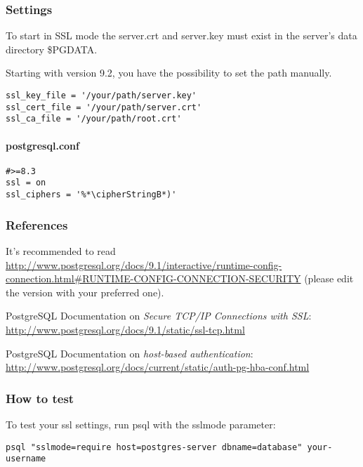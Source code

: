 \subsubsection{Settings}
To start in SSL mode the server.crt and server.key must exist in the server's data directory \$PGDATA.

Starting with version 9.2, you have the possibility to set the path manually.

\begin{lstlisting}
ssl_key_file = '/your/path/server.key'
ssl_cert_file = '/your/path/server.crt'
ssl_ca_file = '/your/path/root.crt'
\end{lstlisting}

\paragraph*{postgresql.conf}
\begin{lstlisting}
#>=8.3
ssl = on 
ssl_ciphers = '%*\cipherStringB*)'
\end{lstlisting}


\subsubsection{References}
\begin{itemize*}
  \item It's recommended to read \url{http://www.postgresql.org/docs/9.1/interactive/runtime-config-connection.html\#RUNTIME-CONFIG-CONNECTION-SECURITY} (please edit the version with your preferred one).
  \item PostgreSQL Documentation on \emph{Secure TCP/IP Connections with SSL}: \url{http://www.postgresql.org/docs/9.1/static/ssl-tcp.html}
  \item PostgreSQL Documentation on \emph{host-based authentication}: \url{http://www.postgresql.org/docs/current/static/auth-pg-hba-conf.html}
\end{itemize*}


\subsubsection{How to test}
To test your ssl settings, run psql with the sslmode parameter:
\begin{lstlisting}
psql "sslmode=require host=postgres-server dbname=database" your-username
\end{lstlisting}

